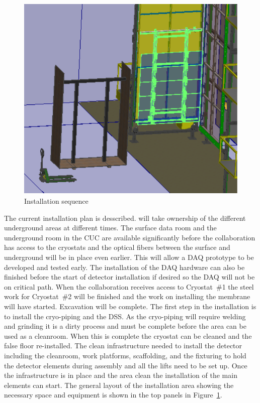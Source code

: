 \begin{figure}[!htb]
\begin{center}
\begin{minipage}[c]{0.32\textwidth}
\end{minipage}
\begin{minipage}[c]{0.32\textwidth}
\includegraphics[width=\textwidth]{far-detector-single-phase/figures/CPA-3.pdf}
\end{minipage}

\caption{Installation sequence}
\label{Install-Seq}
\end{center}
\end{figure}

The current installation plan is desscribed.  will take
ownership of the different underground areas at different times. The
surface data room and the underground room in the CUC are available
significantly before the collaboration has access to the cryostats and
the optical fibers between the surface and underground will be in
place even earlier. This will allow a DAQ prototype to be developed
and tested early. The installation of the DAQ hardware can also be
finished before the start of detector installation if desired so the
DAQ will not be on critical path.  When the collaboration receives
access to Cryostat~\#1 the steel work for Cryostat~\#2 will be
finished and the work on installing the membrane will have
started. Excavation will be complete.  The first step in the
installation is to install the cryo-piping and the DSS. As the
cryo-piping will require welding and grinding it is a dirty process
and must be complete before the area can be used as a cleanroom. When
this is complete the cryostat can be cleaned and the false floor
re-installed. The clean infrastructure needed to install the detector
including the cleanroom, work platforms, scaffolding, and the
fixturing to hold the detector elements during assembly and all the
lifts need to be set up. Once the infrastructure is in place and the area
clean the installation of the main elements can start. The general
layout of the installation area showing the necessary space and
equipment is shown in the top panels in Figure~\ref{Install-Seq}.

